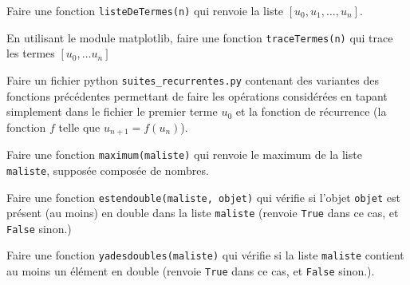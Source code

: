 \begin{enonce}
\ssques Faire une fonction \texttt{listeDeTermes(n)} qui renvoie la liste $[u_0,u_1,\dots,u_n]$.

\ssques En utilisant le module matplotlib, faire une fonction \texttt{traceTermes(n)} qui trace les termes $[u_0,\dots u_n]$

\ssques Faire un fichier python \texttt{suites\_recurrentes.py} contenant des variantes des fonctions précédentes permettant de faire les opérations considérées en tapant simplement dans le fichier le premier terme $u_0$ et  la fonction de récurrence (\cad la fonction $f$ telle que $u_{n+1}=f(u_n)$).

\ques \label{maximum}Faire une fonction \texttt{maximum(maliste)} qui renvoie le maximum de la  liste \texttt{maliste}, supposée composée de nombres.




\ques  Faire une fonction \texttt{estendouble(maliste, objet)} qui v\'{e}rifie si l'objet \texttt{objet} est pr\'{e}sent (au moins) en double dans la liste \texttt{maliste} (renvoie \texttt{True} dans ce cas, et \texttt{False} sinon.)

\ques  Faire une fonction \texttt{yadesdoubles(maliste)} qui v\'{e}rifie si la liste \texttt{maliste} contient au moins un élément en double (renvoie \texttt{True} dans ce cas, et \texttt{False} sinon.).






\end{enonce}

\begin{correction}

\end{correction}

\exo

